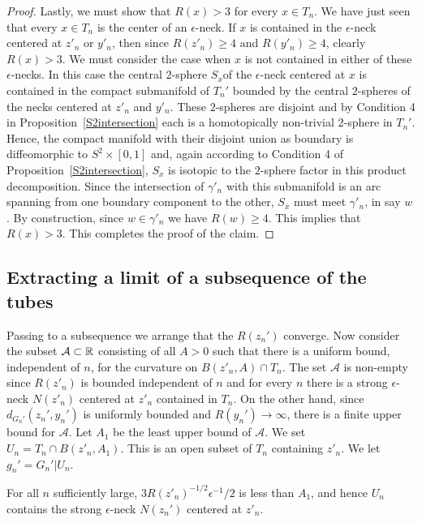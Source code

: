 \begin{proof}
Lastly, we must show that $R(x)>3$ for every $x\in T_n$. We have
just seen that every $x\in T_n$ is the center of an $\epsilon$-neck.
If $x$ is contained in the $\epsilon$-neck centered at $z'_n$ or
$y'_n$, then since $R(z'_n)\ge 4$ and $R(y'_n)\ge 4$, clearly
$R(x)>3$. We must consider the case when $x$ is not contained in
either of these $\epsilon$-necks. In this case the central
$2$-sphere $S_x$of the $\epsilon$-neck centered at $x$ is contained
in the compact submanifold of $T_n'$ bounded by the central
$2$-spheres of the necks centered at $z'_n$ and $y'_n$. These
$2$-spheres are disjoint and by Condition 4 in
Proposition~\ref{S2intersection} each is a homotopically non-trivial
$2$-sphere in $T_n'$. Hence, the compact manifold with their
disjoint union as boundary is diffeomorphic to $S^2\times [0,1]$
and, again according to Condition 4 of
Proposition~\ref{S2intersection}, $S_x$ is isotopic to the
$2$-sphere factor in this product decomposition. Since the
intersection of $\gamma'_n$ with this submanifold is an arc spanning
from one boundary component to the other, $S_x$ must meet
$\gamma'_n$, in say $w$.
 By construction, since $w\in \gamma'_n$ we have $R(w)\ge 4$.
  This implies that $R(x)>3$.
 This completes the proof of the claim.
\end{proof}


\subsection{Extracting a limit of a subsequence of the tubes}

Passing to a subsequence we arrange that the $R(z_n')$ converge. Now
consider the subset ${\mathcal A}\subset \mathbb{R}$ consisting of all
$A>0$ such that there is a uniform bound, independent of $n$, for
the curvature on $B(z'_n,A)\cap T_n$. The set ${\mathcal A}$ is
non-empty since $R(z'_n)$ is bounded independent of $n$ and for
every $n$ there is a strong $\epsilon$-neck $N(z'_n)$ centered at
$z'_n$ contained in $T_n$. On the other hand, since
$d_{G_n'}(z_n',y_n')$ is uniformly bounded and $R(y_n')\rightarrow
\infty$,  there is a finite upper bound for ${\mathcal A}$. Let
$A_1$ be the least upper bound of ${\mathcal A}$. We set
$U_n=T_n\cap B(z'_n,A_1)$. This is an open subset of $T_n$
containing $z'_n$. We let $g_n'=G_n'|U_n$.

\begin{claim}
\label{claim:neck-contained-in-Un}
For all $n$ sufficiently large,  $3R(z'_n)^{-1/2}\epsilon^{-1}/2$ is
less than $A_1$, and hence $U_n$ contains the strong $\epsilon$-neck
$N(z_n')$ centered at $z'_n$.
\end{claim}

